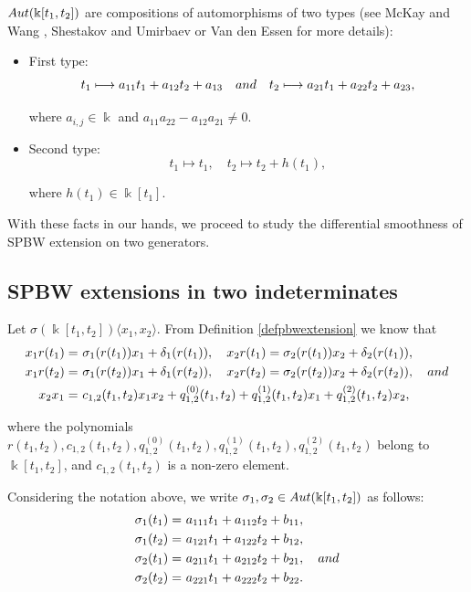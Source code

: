 \documentclass{amsart}
\theoremstyle{definition}
\theoremstyle{remark}
\numberwithin{equation}{section}
\begin{document}
${\rm Aut}(\Bbbk[t_1, t_2])$ are compositions of automorphisms of two types (see McKay and Wang \cite{McKayWang1988}, Shestakov and Umirbaev \cite{ShestakovUmirbaev2003} or Van den Essen \cite{VandenEssen2000} for more details):
\begin{itemize}
    \item First type: 
\begin{equation}
    t_1 \longmapsto a_{11}t_1+a_{12}t_2+a_{13} \quad {\rm and} \quad t_2 \longmapsto a_{21}t_1+a_{22}t_2+a_{23},
\end{equation}

where $a_{i,j}\in \Bbbk$ and $a_{11}a_{22}-a_{12}a_{21}\not = 0$.
    \item Second type:
    \begin{equation}
t_1 \longmapsto t_1, \quad t_2 \longmapsto t_2+h(t_1), 
    \end{equation}

where $h(t_1)\in\Bbbk[t_1]$.
\end{itemize}

With these facts in our hands, we proceed to study the differential smoothness of SPBW extension on two generators.


\subsection{SPBW extensions in two indeterminates}\label{SPBWTMTwoI1}

Let $\sigma(\Bbbk[t_1, t_2]) \langle x_1, x_2\rangle$. From Definition \ref{defpbwextension} we know that
\begin{align*}
    x_1r(t_1) = &\ \sigma_1(r(t_1)) x_1 + \delta_1(r(t_1)),\quad x_2 r(t_1) =  \sigma_2(r(t_1)) x_2 + \delta_2(r(t_1)), \\
    x_1r(t_2) = &\ \sigma_1(r(t_2)) x_1 + \delta_1(r(t_2)),\quad x_2 r(t_2) =  \sigma_2(r(t_2)) x_2 + \delta_2(r(t_2)), \quad {\rm and} \\
    x_2 x_1 = &\ c_{1, 2}(t_1,t_2)x_1 x_2 + q_{1,2}^{(0)}(t_1,t_2) + q_{1,2}^{(1)}(t_1,t_2)x_1 + q_{1,2}^{(2)}(t_1,t_2)x_2, 
\end{align*}

where the polynomials $r(t_1,t_2), c_{1, 2}(t_1,t_2), q_{1, 2}^{(0)}(t_1,t_2), q_{1, 2}^{(1)}(t_1,t_2), q_{1, 2}^{(2)}(t_1,t_2)$ belong to $\Bbbk[t_1, t_2]$, and $c_{1,2}(t_1, t_2)$ is a non-zero element.

Considering the notation above, we write $\sigma_1, \sigma_2 \in {\rm Aut}(\Bbbk[t_1, t_2])$ as follows:
\begin{align*}
    \sigma_1(t_1) = &\ a_{111}t_1+a_{112}t_2+b_{11}, \\
    \sigma_1(t_2) = &\ a_{121}t_1+a_{122}t_2+b_{12}, \\
    \sigma_2(t_1) = &\ a_{211}t_1+a_{212}t_2+b_{21}, \quad {\rm and} \\
    \sigma_2(t_2) = &\ a_{221}t_1+a_{222}t_2+b_{22}.
\end{align*}
\end{document}
